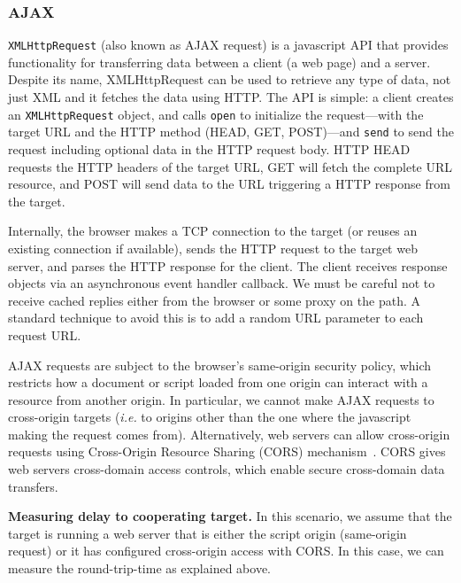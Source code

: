 \documentclass{sig-alternate-10pt}
\begin{document}
\subsubsection{AJAX}

\texttt{XMLHttpRequest} (also known as AJAX request) is a javascript API that provides %
functionality for transferring data between a client (a web page) and a server. Despite its name, XMLHttpRequest can be used to retrieve any type of data, not just XML and it fetches the data using HTTP. %
The API is simple: a client creates an \texttt{XMLHttpRequest} object, and calls \texttt{open} to initialize the request---with the target URL and the HTTP method (HEAD, GET, POST)---and \texttt{send} to send the request including optional data in the HTTP request body. HTTP HEAD requests the HTTP headers of the target URL, GET will fetch the complete URL resource, and POST will send data to the URL triggering a HTTP response from the target.

Internally, the browser makes a TCP connection to the target (or reuses an existing connection if available),
sends the HTTP request to the target web server, and parses the HTTP response for the client. The client receives response objects via an asynchronous event handler callback. 
We must be careful not to receive cached replies either from the browser or some proxy on the path. A standard technique to avoid this is to add a random URL parameter to each request URL.

AJAX requests are subject to the browser's same-origin security policy, which restricts how a document or script loaded from one origin can interact with a resource from another origin. In particular, we cannot make AJAX requests to cross-origin targets (\emph{i.e.} to origins other than the one where the javascript making the request comes from). Alternatively, web servers can allow cross-origin requests using Cross-Origin Resource Sharing (CORS) mechanism~\cite{w3c_cors_????}. CORS gives web servers cross-domain access controls, which enable secure cross-domain data transfers.

\textbf{Measuring delay to cooperating target.} In this scenario, we assume that the target is running a web server that is either the script origin (same-origin request) or it has configured cross-origin access with CORS. In this case, we can measure the round-trip-time as explained above.
\end{document}
